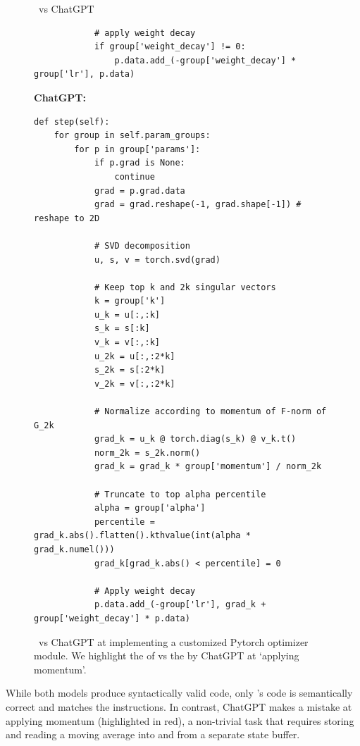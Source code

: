 \begin{figure}[H]
\begin{AIbox}{\DV~vs ChatGPT}
\begin{minipage}[t]{0.5\linewidth}
\begin{verbatim}
            # apply weight decay
            if group['weight_decay'] != 0:
                p.data.add_(-group['weight_decay'] * group['lr'], p.data)
\end{verbatim}
\end{minipage}
\begin{minipage}[t]{0.5\linewidth}
{\bf ChatGPT:}
\begin{verbatim}
def step(self):
    for group in self.param_groups:
        for p in group['params']:
            if p.grad is None:
                continue
            grad = p.grad.data
            grad = grad.reshape(-1, grad.shape[-1]) # reshape to 2D
            
            # SVD decomposition
            u, s, v = torch.svd(grad)
            
            # Keep top k and 2k singular vectors
            k = group['k']
            u_k = u[:,:k]
            s_k = s[:k]
            v_k = v[:,:k]
            u_2k = u[:,:2*k]
            s_2k = s[:2*k]
            v_2k = v[:,:2*k]
            
            # Normalize according to momentum of F-norm of G_2k
            grad_k = u_k @ torch.diag(s_k) @ v_k.t()
            norm_2k = s_2k.norm()
            grad_k = grad_k * group['momentum'] / norm_2k
            
            # Truncate to top alpha percentile
            alpha = group['alpha']
            percentile = grad_k.abs().flatten().kthvalue(int(alpha * grad_k.numel()))
            grad_k[grad_k.abs() < percentile] = 0
            
            # Apply weight decay
            p.data.add_(-group['lr'], grad_k + group['weight_decay'] * p.data)
\end{verbatim}
\end{minipage}
\end{AIbox}
\caption{\DV~vs ChatGPT at implementing a customized Pytorch optimizer module. We highlight the  of \DV vs the  by ChatGPT at `applying momentum'. }
\label{fig:deeplearning}
\end{figure}


While both models produce syntactically valid code, only \DV's code is semantically correct and matches the instructions. In contrast, ChatGPT makes a mistake at applying momentum (highlighted in red), a non-trivial task that requires storing and reading a moving average into and from a separate state buffer.


